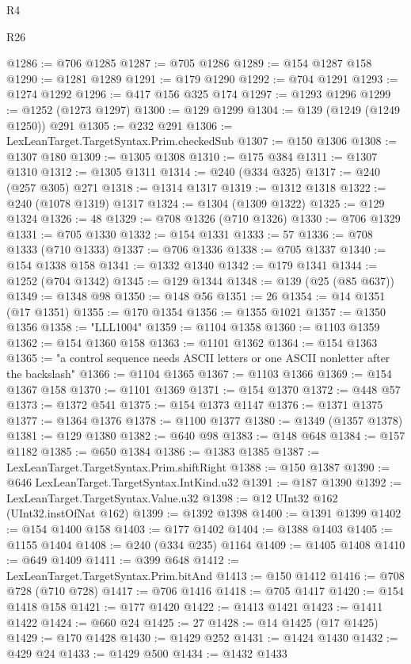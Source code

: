 \begin{lexlean}{R4}
\begin{lexlean}{R26}
\begin{coremodule}
{{{{{{{{{{{{{{{{{{{{{{{{{{{{{{{{{{{{{{{{{{{{{{{{{{{{{{{{{{{{{{{{{{{{{{{{@1286 := @706 @1285
@1287 := @705 @1286
@1289 := @154 @1287 @158
@1290 := @1281 @1289
@1291 := @179 @1290
@1292 := @704 @1291
@1293 := @1274 @1292
@1296 := @417 @156 @325 @174
@1297 := @1293 @1296
@1299 := @1252 (@1273 @1297)
@1300 := @129 @1299
@1304 := @139 (@1249 (@1249 @1250)) @291
@1305 := @232 @291
@1306 := LexLeanTarget.TargetSyntax.Prim.checkedSub
@1307 := @150 @1306
@1308 := @1307 @180
@1309 := @1305 @1308
@1310 := @175 @384
@1311 := @1307 @1310
@1312 := @1305 @1311
@1314 := @240 (@334 @325)
@1317 := @240 (@257 @305) @271
@1318 := @1314 @1317
@1319 := @1312 @1318
@1322 := @240 (@1078 @1319) @1317
@1324 := @1304 (@1309 @1322)
@1325 := @129 @1324
@1326 := 48
@1329 := @708 @1326 (@710 @1326)
@1330 := @706 @1329
@1331 := @705 @1330
@1332 := @154 @1331
@1333 := 57
@1336 := @708 @1333 (@710 @1333)
@1337 := @706 @1336
@1338 := @705 @1337
@1340 := @154 @1338 @158
@1341 := @1332 @1340
@1342 := @179 @1341
@1344 := @1252 (@704 @1342)
@1345 := @129 @1344
@1348 := @139 (@25 (@85 @637))
@1349 := @1348 @98
@1350 := @148 @56
@1351 := 26
@1354 := @14 @1351 (@17 @1351)
@1355 := @170 @1354
@1356 := @1355 @1021
@1357 := @1350 @1356
@1358 := "LLL1004"
@1359 := @1104 @1358
@1360 := @1103 @1359
@1362 := @154 @1360 @158
@1363 := @1101 @1362
@1364 := @154 @1363
@1365 := "a control sequence needs ASCII letters or one ASCII nonletter after the backslash"
@1366 := @1104 @1365
@1367 := @1103 @1366
@1369 := @154 @1367 @158
@1370 := @1101 @1369
@1371 := @154 @1370
@1372 := @448 @57
@1373 := @1372 @541
@1375 := @154 @1373 @1147
@1376 := @1371 @1375
@1377 := @1364 @1376
@1378 := @1100 @1377
@1380 := @1349 (@1357 @1378)
@1381 := @129 @1380
@1382 := @640 @98
@1383 := @148 @648
@1384 := @157 @1182
@1385 := @650 @1384
@1386 := @1383 @1385
@1387 := LexLeanTarget.TargetSyntax.Prim.shiftRight
@1388 := @150 @1387
@1390 := @646 LexLeanTarget.TargetSyntax.IntKind.u32
@1391 := @187 @1390
@1392 := LexLeanTarget.TargetSyntax.Value.u32
@1398 := @12 UInt32 @162 (UInt32.instOfNat @162)
@1399 := @1392 @1398
@1400 := @1391 @1399
@1402 := @154 @1400 @158
@1403 := @177 @1402
@1404 := @1388 @1403
@1405 := @1155 @1404
@1408 := @240 (@334 @235) @1164
@1409 := @1405 @1408
@1410 := @649 @1409
@1411 := @399 @648
@1412 := LexLeanTarget.TargetSyntax.Prim.bitAnd
@1413 := @150 @1412
@1416 := @708 @728 (@710 @728)
@1417 := @706 @1416
@1418 := @705 @1417
@1420 := @154 @1418 @158
@1421 := @177 @1420
@1422 := @1413 @1421
@1423 := @1411 @1422
@1424 := @660 @24
@1425 := 27
@1428 := @14 @1425 (@17 @1425)
@1429 := @170 @1428
@1430 := @1429 @252
@1431 := @1424 @1430
@1432 := @429 @24
@1433 := @1429 @500
@1434 := @1432 @1433
}}}}}}}}}}}}}}}}}}}}}}}}}}}}}}}}}}}}}}}}}}}}}}}}}}}}}}}}}}}}}}}}}}}}}}}}
\end{coremodule}
\end{lexlean}
\end{lexlean}
